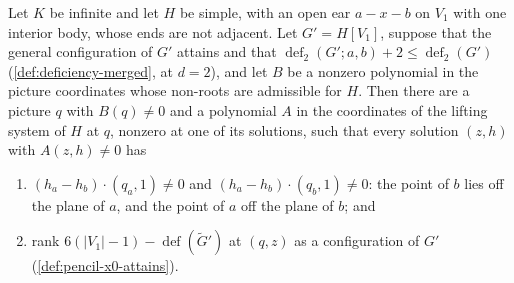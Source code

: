 \begin{lemma}
  \label{lem:pencil-one-ear-base}
  \leanok
  Let $K$ be infinite and let $H$ be simple, with an open ear $a - x - b$
  on $V_1$ with one interior body, whose ends are not adjacent. Let
  $G' = H[V_1]$, suppose that the general configuration of $G'$ attains
  and that $\operatorname{def}_2(G'; a, b) + 2 \le
  \operatorname{def}_2(G')$ (\cref{def:deficiency-merged}, at $d = 2$),
  and let $B$ be a nonzero polynomial in the picture coordinates whose
  non-roots are admissible for $H$. Then there are a picture $q$ with
  $B(q) \neq 0$ and a polynomial $A$ in the coordinates of the lifting
  system of $H$ at $q$, nonzero at one of its solutions, such that every
  solution $(z, h)$ with $A(z, h) \neq 0$ has
  \begin{enumerate}
    \item $(h_a - h_b) \cdot (q_a, 1) \neq 0$ and
      $(h_a - h_b) \cdot (q_b, 1) \neq 0$: the point of $b$ lies off the
      plane of $a$, and the point of $a$ off the plane of $b$; and
    \item rank $6(|V_1| - 1) - \operatorname{def}(\tilde G')$ at $(q, z)$
      as a configuration of $G'$ (\cref{def:pencil-x0-attains}).
  \end{enumerate}
\end{lemma}
